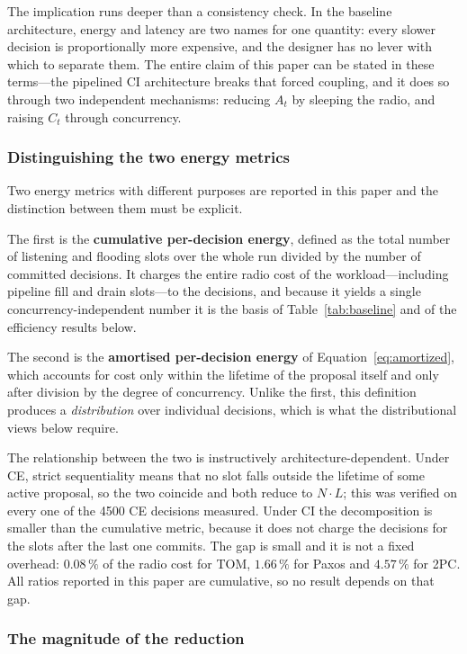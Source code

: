 \documentclass[journal]{IEEEtran}
\newcommand{\CI}{CI}                      %
\newcommand{\CE}{CE}                      %
\newcommand{\Nnodes}{N}                   %
\begin{document}
The implication runs deeper than a consistency check. In the baseline
architecture, energy and latency are two names for one quantity: every
slower decision is proportionally more expensive, and the designer has no
lever with which to separate them. The entire claim of this paper can be
stated in these terms---the pipelined \CI{} architecture breaks that
forced coupling, and it does so through two independent mechanisms:
reducing $A_t$ by sleeping the radio, and raising $C_t$ through
concurrency.

\subsubsection{Distinguishing the two energy metrics}

Two energy metrics with different purposes are reported in this paper and
the distinction between them must be explicit.

The first is the \textbf{cumulative per-decision energy}, defined as the
total number of listening and flooding slots over the whole run divided by
the number of committed decisions. It charges the entire radio cost of the
workload---including pipeline fill and drain slots---to the decisions, and
because it yields a single concurrency-independent number it is the basis
of Table~\ref{tab:baseline} and of the efficiency results below.

The second is the \textbf{amortised per-decision energy} of
Equation~\eqref{eq:amortized}, which accounts for cost only within the
lifetime of the proposal itself and only after division by the degree of
concurrency. Unlike the first, this definition produces a
\emph{distribution} over individual decisions, which is what the
distributional views below require.

The relationship between the two is instructively architecture-dependent.
Under \CE, strict sequentiality means that no slot falls outside the lifetime
of some active proposal, so the two coincide and both reduce to
$\Nnodes \cdot L$; this was verified on every one of the 4500 \CE{} decisions
measured. Under \CI{} the decomposition is smaller than the cumulative metric,
because it does not charge the decisions for the slots after the last one
commits. The gap is small and it is not a fixed overhead: $0.08\,\%$ of the
radio cost for TOM, $1.66\,\%$ for Paxos and $4.57\,\%$ for 2PC. All ratios
reported in this paper are cumulative, so no result depends on that gap.

\subsubsection{The magnitude of the reduction}
\end{document}
